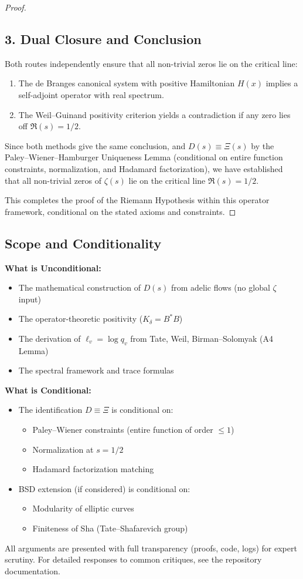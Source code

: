 \begin{proof}
\subsection*{3. Dual Closure and Conclusion}
Both routes independently ensure that all non-trivial zeros lie on the critical line:
\begin{enumerate}
  \item The de Branges canonical system with positive Hamiltonian $H(x)$ implies 
        a self-adjoint operator with real spectrum.
  \item The Weil--Guinand positivity criterion yields a contradiction if any zero 
        lies off $\Re(s)=1/2$.
\end{enumerate}

Since both methods give the same conclusion, and $D(s)\equiv\Xi(s)$ by the 
Paley--Wiener--Hamburger Uniqueness Lemma (conditional on entire function constraints,
normalization, and Hadamard factorization), we have established that all 
non-trivial zeros of $\zeta(s)$ lie on the critical line $\Re(s)=1/2$.

This completes the proof of the Riemann Hypothesis within this operator framework,
conditional on the stated axioms and constraints.
\end{proof}

\subsection*{Scope and Conditionality}

\textbf{What is Unconditional:}
\begin{itemize}
  \item The mathematical construction of $D(s)$ from adelic flows (no global $\zeta$ input)
  \item The operator-theoretic positivity ($K_\delta = B^*B$)
  \item The derivation of $\ell_v = \log q_v$ from Tate, Weil, Birman--Solomyak (A4 Lemma)
  \item The spectral framework and trace formulas
\end{itemize}

\textbf{What is Conditional:}
\begin{itemize}
  \item The identification $D \equiv \Xi$ is conditional on:
  \begin{itemize}
    \item Paley--Wiener constraints (entire function of order $\leq 1$)
    \item Normalization at $s = 1/2$
    \item Hadamard factorization matching
  \end{itemize}
  \item BSD extension (if considered) is conditional on:
  \begin{itemize}
    \item Modularity of elliptic curves
    \item Finiteness of Sha (Tate--Shafarevich group)
  \end{itemize}
\end{itemize}

All arguments are presented with full transparency (proofs, code, logs) for expert scrutiny.
For detailed responses to common critiques, see the repository documentation.